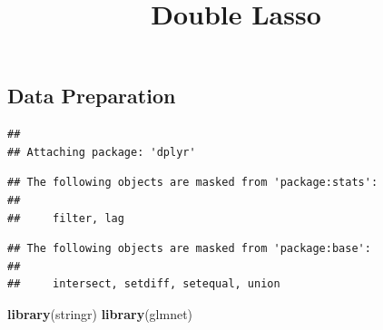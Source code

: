 \documentclass[
]{article}
\title{Double Lasso}
\author{}
\date{\vspace{-2.5em}}
\newenvironment{Shaded}{\begin{snugshade}}{\end{snugshade}}
\newcommand{\CommentTok}[1]{\textcolor[rgb]{0.56,0.35,0.01}{\textit{#1}}}
\newcommand{\DataTypeTok}[1]{\textcolor[rgb]{0.13,0.29,0.53}{#1}}
\newcommand{\KeywordTok}[1]{\textcolor[rgb]{0.13,0.29,0.53}{\textbf{#1}}}
\newcommand{\NormalTok}[1]{#1}
\newcommand{\OperatorTok}[1]{\textcolor[rgb]{0.81,0.36,0.00}{\textbf{#1}}}
\newcommand{\OtherTok}[1]{\textcolor[rgb]{0.56,0.35,0.01}{#1}}
\newcommand{\StringTok}[1]{\textcolor[rgb]{0.31,0.60,0.02}{#1}}
\begin{document}
\maketitle

\begin{Shaded}
\end{Shaded}

\hypertarget{data-preparation}{%
\subsection{Data Preparation}\label{data-preparation}}

\begin{Shaded}
\end{Shaded}

\begin{verbatim}
## 
## Attaching package: 'dplyr'
\end{verbatim}

\begin{verbatim}
## The following objects are masked from 'package:stats':
## 
##     filter, lag
\end{verbatim}

\begin{verbatim}
## The following objects are masked from 'package:base':
## 
##     intersect, setdiff, setequal, union
\end{verbatim}

\begin{Shaded}
\begin{Highlighting}[]
\KeywordTok{library}\NormalTok{(stringr)}
\KeywordTok{library}\NormalTok{(glmnet)}
\end{Highlighting}
\end{Shaded}
\end{document}

